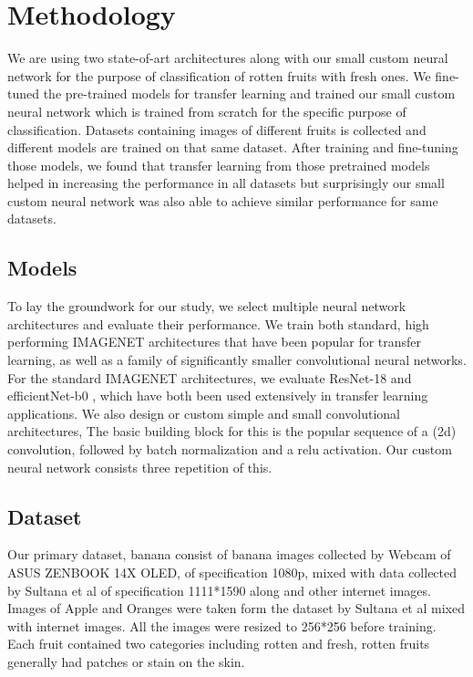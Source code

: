 \documentclass[11pt]{article}
\begin{document}
\section{Methodology}
We are using two state-of-art architectures along with our small custom neural network for the purpose of classification of rotten fruits with fresh ones. We fine-tuned the pre-trained models for transfer learning\cite{methodology1} and trained our small custom neural network which is trained from scratch for the specific purpose of classification. Datasets containing images of different fruits is collected and different models are trained on that same dataset. After training and fine-tuning those models, we found that transfer learning from those pretrained models helped in increasing the performance in all datasets but surprisingly our small custom neural network was also able to achieve similar performance for same datasets.
\subsection{Models}


To lay the groundwork for our study, we select multiple neural network architectures and evaluate their performance. We train both standard, high performing IMAGENET architectures that have been popular for transfer learning, as well as a family of significantly smaller convolutional neural networks. For the standard IMAGENET architectures, we evaluate ResNet-18 \cite{model1-11} and efficientNet-b0 \cite{model2}, which have both been used extensively in transfer learning applications. We also design or custom simple and small convolutional architectures, The basic building block for this is the popular sequence of a (2d) convolution, followed by batch normalization \cite{model3} and a relu activation. Our custom neural network consists three repetition of this.


\subsection{Dataset}
Our primary dataset, banana consist of banana images collected by Webcam of ASUS ZENBOOK 14X OLED, of specification 1080p, mixed with data collected by Sultana et al of specification 1111*1590 along and other internet images. Images of Apple and Oranges were taken form the dataset by Sultana et al \cite{dataset1}  mixed with internet images. All the images were resized to 256*256 before training. Each fruit contained two categories including rotten and fresh, rotten fruits generally had patches or stain on  the skin.
\end{document}
